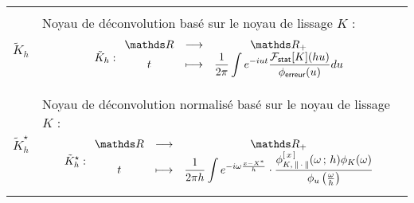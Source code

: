 \begin{tabularx}{\linewidth}{lX}
	\\
	\midrule
	\\
	$\tilde K_h$
	                  & Noyau de déconvolution basé sur le noyau de lissage $K$ : \linebreak $$\tilde K_h : \func{\grandR}{\Rplus}{t}{\displaystyle\frac 1 {2\pi} \int e^{-iut} \frac{\mathcal F_{\textsf{stat}}[K](hu)}{\phi_{\textsf{erreur}}(u)} du} $$
	\\\\
	$\tilde K_h^\star$ 
	                  & Noyau de déconvolution normalisé basé sur le noyau de lissage $K$ :\linebreak $$\tilde K_h^\star : \func{\grandR}{\Rplus}{t}{\displaystyle\frac{1}{2\pi h}\int e^{-i\omega \frac{x-X^*}{h}} \cdot \frac{\phi_{K, \, \Vert \, \cdot \, \Vert}^{[\,x\,]}(\omega \,;\, h)\phi_K(\omega)}{\phi_u\left(\frac \omega h\right)}}$$ 
	\\
	\bottomrule
\end{tabularx}

\pagebreak

